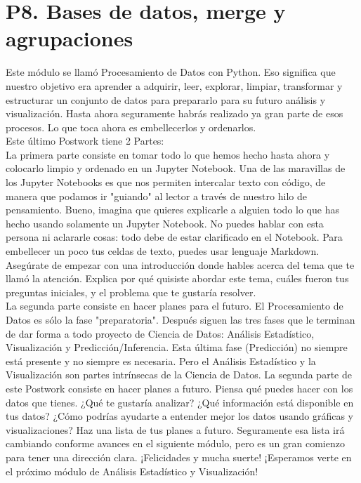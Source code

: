\documentclass{article}
\begin{document}
\section{P8. Bases de datos, merge y agrupaciones}
Este módulo se llamó Procesamiento de Datos con Python. Eso significa que nuestro objetivo era aprender a adquirir, leer, explorar, limpiar, transformar y estructurar un conjunto de datos para prepararlo para su futuro análisis y visualización. Hasta ahora seguramente habrás realizado ya gran parte de esos procesos. Lo que toca ahora es embellecerlos y ordenarlos.\\
Este último Postwork tiene 2 Partes:\\
La primera parte consiste en tomar todo lo que hemos hecho hasta ahora y colocarlo limpio y ordenado en un Jupyter Notebook. Una de las maravillas de los Jupyter Notebooks es que nos permiten intercalar texto con código, de manera que podamos ir "guiando" al lector a través de nuestro hilo de pensamiento. Bueno, imagina que quieres explicarle a alguien todo lo que has hecho usando solamente un Jupyter Notebook. No puedes hablar con esta persona ni aclararle cosas: todo debe de estar clarificado en el Notebook. Para embellecer un poco tus celdas de texto, puedes usar lenguaje Markdown. Asegúrate de empezar con una introducción donde hables acerca del tema que te llamó la atención. Explica por qué quisiste abordar este tema, cuáles fueron tus preguntas iniciales, y el problema que te gustaría resolver.\\
La segunda parte consiste en hacer planes para el futuro. El Procesamiento de Datos es sólo la fase "preparatoria". Después siguen las tres fases que le terminan de dar forma a todo proyecto de Ciencia de Datos: Análisis Estadístico, Visualización y Predicción/Inferencia. Esta última fase (Predicción) no siempre está presente y no siempre es necesaria. Pero el Análisis Estadístico y la Visualización son partes intrínsecas de la Ciencia de Datos. La segunda parte de este Postwork consiste en hacer planes a futuro. Piensa qué puedes hacer con los datos que tienes. ¿Qué te gustaría analizar? ¿Qué información está disponible en tus datos? ¿Cómo podrías ayudarte a entender mejor los datos usando gráficas y visualizaciones? Haz una lista de tus planes a futuro. Seguramente esa lista irá cambiando conforme avances en el siguiente módulo, pero es un gran comienzo para tener una dirección clara.
¡Felicidades y mucha suerte! ¡Esperamos verte en el próximo módulo de Análisis Estadístico y Visualización!
\end{document}
